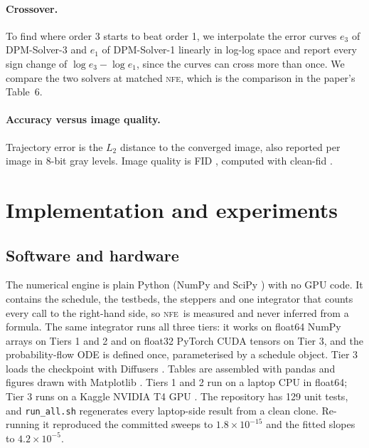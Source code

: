 \documentclass[sigconf]{acmart}
\newcommand{\NFE}{\textsc{nfe}}
\begin{document}
\paragraph{Crossover.} To find where order 3 starts to beat order 1, we
interpolate the error curves $e_3$ of DPM-Solver-3 and $e_1$ of DPM-Solver-1
linearly in log-log space and report every sign change of $\log e_3-\log e_1$,
since the curves can cross more than once. We compare the two solvers at matched \NFE, which is the comparison in the
paper's Table~6.

\paragraph{Accuracy versus image quality.} Trajectory error is the $L_2$ distance
to the converged image, also reported per image in 8-bit gray levels. Image
quality is FID \cite{heusel2017fid}, computed with clean-fid
\cite{parmar2022cleanfid}.

\section{Implementation and experiments}

\subsection{Software and hardware}

The numerical engine is plain Python (NumPy \cite{harris2020numpy} and SciPy
\cite{virtanen2020scipy}) with no GPU code. It contains the schedule, the
testbeds, the steppers and one integrator that counts every call to the
right-hand side, so \NFE\ is measured and never inferred from a formula. The same
integrator runs all three tiers: it works on float64 NumPy arrays on Tiers 1 and 2
and on float32 PyTorch \cite{paszke2019pytorch} CUDA tensors on Tier 3, and the
probability-flow ODE is defined once, parameterised by a schedule object. Tier 3
loads the checkpoint with Diffusers \cite{vonplaten2022diffusers}. Tables are
assembled with pandas \cite{mckinney2010pandas} and figures drawn with Matplotlib
\cite{hunter2007matplotlib}. Tiers 1 and 2
run on a laptop CPU in float64; Tier 3 runs on a Kaggle NVIDIA T4 GPU
\cite{kaggle}. The repository has 129 unit tests, and \texttt{run\_all.sh}
regenerates every laptop-side result from a clean clone. Re-running it reproduced
the committed sweeps to $1.8\times10^{-15}$ and the fitted slopes to
$4.2\times10^{-5}$.
\end{document}

